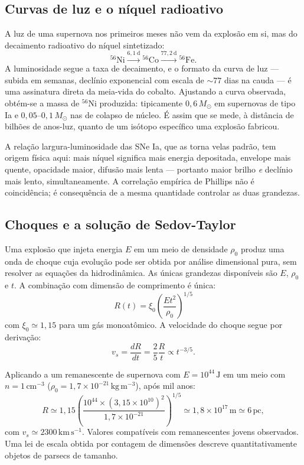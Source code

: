 \documentclass[11pt,a4paper]{article}
\begin{document}
\subsection*{Curvas de luz e o níquel radioativo}

A luz de uma supernova nos primeiros meses não vem da explosão em si, mas do decaimento radioativo do níquel sintetizado:
\[
^{56}\mathrm{Ni}\xrightarrow{6{,}1\ \mathrm{d}}{}^{56}\mathrm{Co}\xrightarrow{77{,}2\ \mathrm{d}}{}^{56}\mathrm{Fe}.
\]
A luminosidade segue a taxa de decaimento, e o formato da curva de luz --- subida em semanas, declínio exponencial com escala de $\sim77$ dias na cauda --- é uma assinatura direta da meia-vida do cobalto. Ajustando a curva observada, obtém-se a massa de $^{56}$Ni produzida: tipicamente $0{,}6\,M_\odot$ em supernovas de tipo Ia e $0{,}05$--$0{,}1\,M_\odot$ nas de colapso de núcleo. É assim que se mede, à distância de bilhões de anos-luz, quanto de um isótopo específico uma explosão fabricou.

A relação largura-luminosidade das SNe Ia, que as torna velas padrão, tem origem física aqui: mais níquel significa mais energia depositada, envelope mais quente, opacidade maior, difusão mais lenta --- portanto maior brilho \emph{e} declínio mais lento, simultaneamente. A correlação empírica de Phillips não é coincidência; é consequência de a mesma quantidade controlar as duas grandezas.

\subsection*{Choques e a solução de Sedov-Taylor}

Uma explosão que injeta energia $E$ em um meio de densidade $\rho_0$ produz uma onda de choque cuja evolução pode ser obtida por análise dimensional pura, sem resolver as equações da hidrodinâmica. As únicas grandezas disponíveis são $E$, $\rho_0$ e $t$. A combinação com dimensão de comprimento é única:
\[
\boxed{\ R(t)=\xi_0\left(\frac{Et^{2}}{\rho_0}\right)^{1/5}\ }
\]
com $\xi_0\simeq1{,}15$ para um gás monoatômico. A velocidade do choque segue por derivação:
\[
v_s=\frac{dR}{dt}=\frac{2}{5}\frac{R}{t}\propto t^{-3/5}.
\]

Aplicando a um remanescente de supernova com $E=10^{44}\,\mathrm{J}$ em um meio com $n=1\,\mathrm{cm^{-3}}$ ($\rho_0=1{,}7\times10^{-21}\,\mathrm{kg\,m^{-3}}$), após mil anos:
\[
R\simeq1{,}15\left(\frac{10^{44}\times(3{,}15\times10^{10})^{2}}{1{,}7\times10^{-21}}\right)^{1/5}\simeq1{,}8\times10^{17}\,\mathrm{m}\simeq6\,\mathrm{pc},
\]
com $v_s\simeq2300\,\mathrm{km\,s^{-1}}$. Valores compatíveis com remanescentes jovens observados. Uma lei de escala obtida por contagem de dimensões descreve quantitativamente objetos de parsecs de tamanho.
\end{document}
